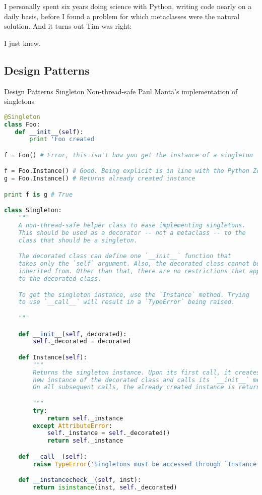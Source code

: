 I personally spent six years doing science with Python, writing code nearly on a daily basis, before I found a problem for which metaclasses were the natural solution. And it turns out Tim was right:

I just knew.

\subsection{Design Patterns}

Design Patterns
Singleton
Non-thread-safe
Paul Manta's implementation of singletons

\begin{lstlisting}[language=Python]
@Singleton
class Foo:
   def __init__(self):
       print 'Foo created'

f = Foo() # Error, this isn't how you get the instance of a singleton

f = Foo.Instance() # Good. Being explicit is in line with the Python Zen
g = Foo.Instance() # Returns already created instance

print f is g # True

class Singleton:
    """
    A non-thread-safe helper class to ease implementing singletons.
    This should be used as a decorator -- not a metaclass -- to the
    class that should be a singleton.

    The decorated class can define one `__init__` function that
    takes only the `self` argument. Also, the decorated class cannot be
    inherited from. Other than that, there are no restrictions that apply
    to the decorated class.

    To get the singleton instance, use the `Instance` method. Trying
    to use `__call__` will result in a `TypeError` being raised.

    """

    def __init__(self, decorated):
        self._decorated = decorated

    def Instance(self):
        """
        Returns the singleton instance. Upon its first call, it creates a
        new instance of the decorated class and calls its `__init__` method.
        On all subsequent calls, the already created instance is returned.

        """
        try:
            return self._instance
        except AttributeError:
            self._instance = self._decorated()
            return self._instance

    def __call__(self):
        raise TypeError('Singletons must be accessed through `Instance()`.')

    def __instancecheck__(self, inst):
        return isinstance(inst, self._decorated)
\end{lstlisting}

